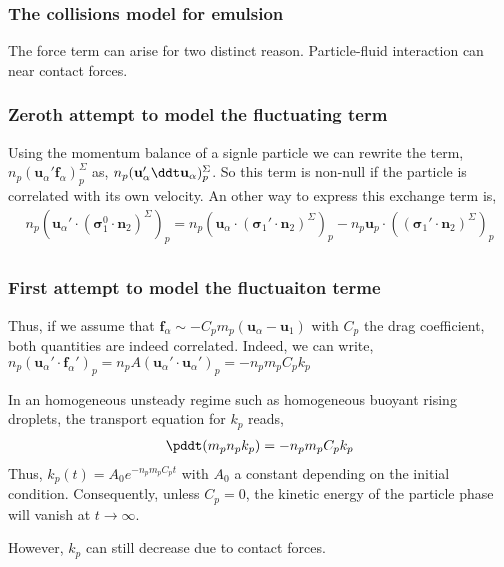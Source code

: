 \subsubsection*{The collisions model for emulsion}

The force term can arise for two distinct reason.
Particle-fluid interaction can near contact forces. 


\subsubsection*{Zeroth attempt to model the fluctuating term}
Using the momentum balance of a signle particle we can rewrite the term, $n_p (\textbf{u}_\alpha' \textbf{f}_\alpha)^\Sigma_p$ as,  $n_p (\textbf{u}_\alpha' \ddt \textbf{u}_\alpha)^\Sigma_p$.
So this term is non-null if the particle is correlated with its own velocity. 
An other way to express this exchange term is, 
\begin{multline*}
    n_p (\textbf{u}_\alpha' \cdot (\bm{\sigma}_1^0 \cdot  \textbf{n}_2)^\Sigma)_p
    = n_p (\textbf{u}_\alpha \cdot (\bm{\sigma}_1' \cdot  \textbf{n}_2)^\Sigma)_p
    - n_p\textbf{u}_p \cdot ( (\bm{\sigma}_1' \cdot  \textbf{n}_2)^\Sigma)_p
    \\
\end{multline*}

\subsubsection*{First attempt to model the fluctuaiton terme}
Thus, if we assume that $\textbf{f}_\alpha \sim - C_p m_p  (\textbf{u}_\alpha - \textbf{u}_1)$ with $C_p $ the drag coefficient, both quantities are indeed correlated.
Indeed, we can write, $n_p (\textbf{u}_\alpha' \cdot \textbf{f}_\alpha' )_p = n_p A (\textbf{u}_\alpha' \cdot \textbf{u}_\alpha' )_p = - n_p m_p C_p k_p $

In an homogeneous unsteady regime such as homogeneous buoyant rising droplets, the transport equation for $k_p$ reads, 
\begin{multline*}
    \pddt(m_p n_pk_p)
    = 
    - n_p m_p C_p k_p
    \\
\end{multline*}
Thus, $k_p(t) = A_0 e^{- n_p m_p C_p t}$ with $A_0$ a constant depending on the initial condition. 
Consequently, unless $C_p = 0$, the kinetic energy of the particle phase will vanish at $t \rightarrow \infty$.  

However, $k_p$ can still decrease due to contact forces. 

